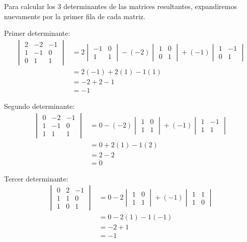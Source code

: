 \documentclass{article}
\begin{document}
Para calcular los 3 determinantes de las matrices resultantes, expandiremos nuevamente por la primer fila de cada matriz.

Primer determinante:
\begin{align}
    \begin{vmatrix}
    2 & -2 & -1 \\
    1 & -1 & 0 \\
    0 & 1 & 1
    \end{vmatrix} &= 2 \begin{vmatrix} -1 & 0 \\ 1 & 1 \end{vmatrix} - (-2) \begin{vmatrix} 1 & 0 \\ 0 & 1 \end{vmatrix} + (-1) \begin{vmatrix} 1 & -1 \\ 0 & 1 \end{vmatrix} \\
    &= 2(-1) + 2(1) - 1(1) \\
    &= -2 + 2 - 1 \\
    &= -1
\end{align}

Segundo determinante:
\begin{align}
    \begin{vmatrix}
    0 & -2 & -1 \\
    1 & -1 & 0 \\
    1 & 1 & 1
    \end{vmatrix} &= 0 - (-2) \begin{vmatrix} 1 & 0 \\ 1 & 1 \end{vmatrix} + (-1) \begin{vmatrix} 1 & -1 \\ 1 & 1 \end{vmatrix} \\
    &= 0 + 2(1) - 1(2) \\
    &= 2 - 2 \\
    &= 0
\end{align}

Tercer determinante:
\begin{align}
    \begin{vmatrix}
    0 & 2 & -1 \\
    1 & 1 & 0 \\
    1 & 0 & 1
    \end{vmatrix} &= 0 - 2 \begin{vmatrix} 1 & 0 \\ 1 & 1 \end{vmatrix} + (-1) \begin{vmatrix} 1 & 1 \\ 1 & 0 \end{vmatrix} \\
    &= 0 - 2(1) - 1(-1) \\
    &= -2 + 1 \\
    &= -1
\end{align}
\end{document}
